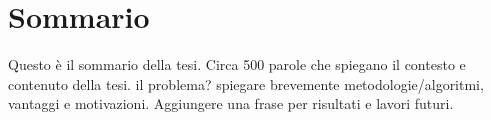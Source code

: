 \chapter{Sommario}
\label{Sommario}
\thispagestyle{empty}

Questo è il sommario della tesi.
Circa 500 parole che spiegano il contesto e contenuto della tesi. il problema? spiegare brevemente metodologie/algoritmi, vantaggi e motivazioni.
Aggiungere una frase per risultati e lavori futuri.
